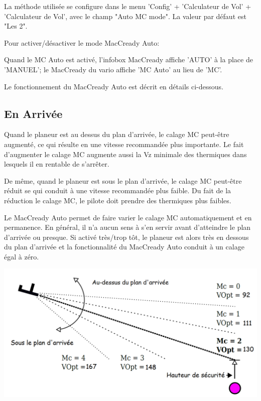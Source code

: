 La méthode utilisée se configure dans le menu 'Config' + 'Calculateur de Vol' + 'Calculateur de Vol', avec le champ "Auto MC mode". La valeur par défaut est "Les 2".

Pour activer/désactiver le mode MacCready Auto:
\begin{quote}
\blink{}
\end{quote}

Quand le MC Auto est activé, l'infobox MacCready affiche 'AUTO' à la place de 'MANUEL'; le MacCready du vario affiche 'MC Auto' au lieu de 'MC'.

Le fonctionnement du MacCready Auto est décrit en détails ci-dessous.

\subsection*{En Arrivée}
Quand le planeur est au dessus du plan d'arrivée, le calage MC peut-être augmenté, ce qui résulte en une vitesse recommandée plus importante. Le fait d'augmenter le calage MC augmente aussi la Vz minimale des thermiques dans lesquels il en rentable de s'arrêter.

De même, quand le planeur est sous le plan d'arrivée, le calage MC peut-être réduit se qui conduit à une vitesse recommandée plus faible. Du fait de la réduction le calage MC, le pilote doit prendre des thermiques plus faibles.

Le MacCready Auto permet de faire varier le calage MC automatiquement et en permanence. En général, il n'a aucun sens à s'en servir avant d'atteindre le plan d'arrivée ou presque. Si activé très/trop tôt, le planeur est alors très en dessous du plan d'arrivée et la fonctionnalité du MacCready Auto conduit à un calage égal à zéro.

\begin{maxipage}
\begin{center}
\includegraphics[angle=0,width=0.8\linewidth,keepaspectratio='true']{figures/figure_auto_maccready.png}
\end{center}
\end{maxipage}

